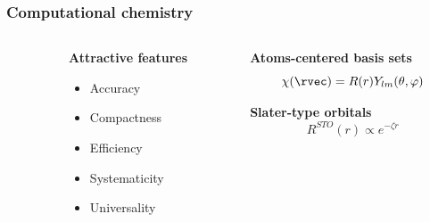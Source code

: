 \begin{frame}
    \frametitle{Computational chemistry}
    \begin{columns}
    \begin{column}{.10\textwidth}
    \end{column}
    \begin{column}{.30\textwidth}
    \textbf{Attractive features}
    \begin{itemize}
        \item {\color{green} Accuracy}
        \item {\color{green} Compactness}
        \item {\color{red} Efficiency}
        \item {\color{yellow} Systematicity}
        \item {\color{yellow} Universality}
    \end{itemize}
    \end{column}
    \begin{column}{.60\textwidth}
    \centering
    \textbf{Atoms-centered basis sets}
    \begin{equation}
        \nonumber
        \chi(\rvec) = R(r)Y_{lm}(\theta,\varphi)
    \end{equation}
    
    \vspace{5mm}

    \textbf{Slater-type orbitals}
    \begin{equation}
        \nonumber
        R^{STO}(r) \propto e^{-\zeta r}
    \end{equation}
    \end{column}
    \end{columns}    

    \vspace{5mm}


\end{frame}
